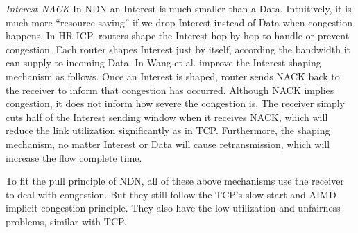 \emph{Interest NACK} In NDN an Interest is much smaller than a Data. Intuitively, it is much more ``resource-saving'' if we drop Interest instead of Data when congestion happens. In HR-ICP\cite{shape}, routers shape the Interest hop-by-hop to handle or prevent congestion. Each router shapes Interest just by itself, according the bandwidth it can supply to incoming Data. In \cite{improveshape} Wang et al. improve the Interest shaping mechanism as follows. Once an Interest is shaped, router sends NACK back to the receiver to inform that congestion has occurred. Although NACK implies congestion, it does not inform how severe the congestion is. The receiver simply cuts half of the Interest sending window when it receives NACK, which will reduce the link utilization significantly as in TCP. Furthermore, the shaping mechanism, no matter Interest or Data will cause retransmission, which will increase the flow complete time.

To fit the pull principle of NDN, all of these above mechanisms use the receiver to deal with congestion. But they still follow the TCP's slow start and AIMD implicit congestion principle. They also have the low utilization and unfairness problems, similar with TCP\cite{NDNanalysis}.
